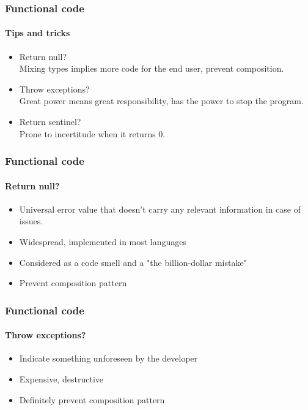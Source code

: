 \begin{frame}
    \frametitle{Functional code}
    \framesubtitle{Tips and tricks}

    \begin{itemize}
        \item Return null?\pause
            \\\textcolor{ecgrey!50}{Mixing types implies more code for the end
            user, prevent composition.}
        \item Throw exceptions?\pause
            \\\textcolor{ecgrey!50}{Great power means great responsibility, has
            the power to stop the program.}
        \item Return sentinel?\pause
            \\\textcolor{ecgrey!50}{Prone to incertitude when it returns 0.}
    \end{itemize}

\end{frame}

\begin{frame}
    \frametitle{Functional code}
    \framesubtitle{Return null?}

    \begin{itemize}[<+->]
        \item Universal error value that doesn't carry any relevant information
            in case of issues.
        \item Widespread, implemented in most languages
        \item Considered as a code smell and a "the billion-dollar mistake"
        \item Prevent composition pattern
    \end{itemize}

\end{frame}

\begin{frame}
    \frametitle{Functional code}
    \framesubtitle{Throw exceptions?}

    \begin{itemize}[<+->]
        \item Indicate something unforeseen by the developer
        \item Expensive, destructive
        \item Definitely prevent composition pattern
    \end{itemize}

\end{frame}

